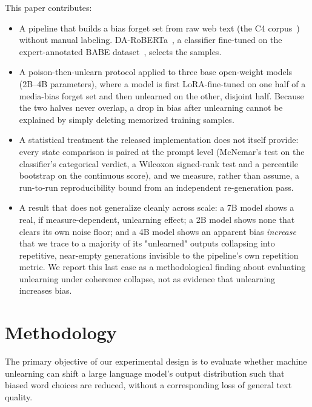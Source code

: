 \documentclass[runningheads]{llncs}
\begin{document}
This paper contributes:
\begin{itemize}
  \item A pipeline that builds a bias forget set from raw web text (the
  C4 corpus~\cite{raffel2020exploring}) without manual labeling.
  DA-RoBERTa~\cite{krieger2022domain}, a classifier fine-tuned on the
  expert-annotated BABE dataset~\cite{spinde-etal-2021-neural-media}, selects the
  samples.
  \item A poison-then-unlearn protocol applied to three base open-weight
  models (2B--4B parameters), where a model is first LoRA-fine-tuned on
  one half of a media-bias forget set and then unlearned on the other,
  disjoint half. Because the two halves never overlap, a drop in bias
  after unlearning cannot be explained by simply deleting memorized
  training samples.
  \item A statistical treatment the released implementation does not
  itself provide: every state comparison is paired at the prompt level
  (McNemar's test on the classifier's categorical verdict, a Wilcoxon
  signed-rank test and a percentile bootstrap on the continuous score),
  and we measure, rather than assume, a run-to-run reproducibility
  bound from an independent re-generation pass.
  \item A result that does not generalize cleanly across scale: a 7B
  model shows a real, if measure-dependent, unlearning effect; a 2B
  model shows none that clears its own noise floor; and a 4B model
  shows an apparent bias \emph{increase} that we trace to a majority
  of its "unlearned" outputs collapsing into repetitive, near-empty
  generations invisible to the pipeline's own repetition metric.
  We report this last case as a methodological finding about
  evaluating unlearning under coherence collapse, not as evidence that
  unlearning increases bias.
\end{itemize}



\section{Methodology}
\label{sec:methodology}
The primary objective of our experimental design is to evaluate whether machine unlearning can shift a large language model's output distribution such that biased word choices are reduced, without a corresponding loss of general text quality.
\end{document}
